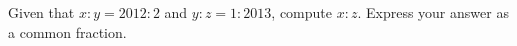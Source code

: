 Given that $x : y = 2012 : 2$ and $y : z = 1 : 2013$, compute $x : z$. Express your answer as a common fraction.
